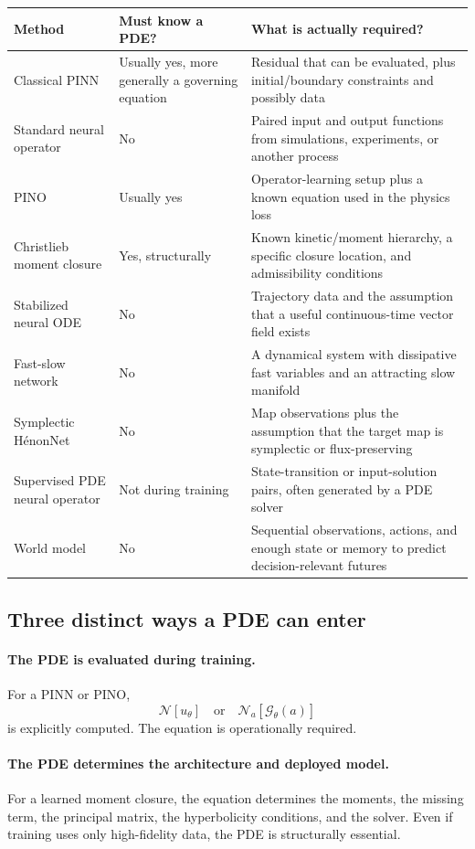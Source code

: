 \documentclass[11pt]{article}
\newcommand{\G}{\mathcal{G}}
\newcommand{\N}{\mathcal{N}}
\begin{document}
\begin{center}
\begin{tabularx}{\textwidth}{@{}P{0.28\textwidth}P{0.18\textwidth}Y@{}}
\toprule
\textbf{Method} & \textbf{Must know a PDE?} & \textbf{What is actually required?} \\
\midrule
Classical PINN & Usually yes, more generally a governing equation & Residual that can be evaluated, plus initial/boundary constraints and possibly data \\
Standard neural operator & No & Paired input and output functions from simulations, experiments, or another process \\
PINO & Usually yes & Operator-learning setup plus a known equation used in the physics loss \\
Christlieb moment closure & Yes, structurally & Known kinetic/moment hierarchy, a specific closure location, and admissibility conditions \\
Stabilized neural ODE & No & Trajectory data and the assumption that a useful continuous-time vector field exists \\
Fast-slow network & No & A dynamical system with dissipative fast variables and an attracting slow manifold \\
Symplectic H\'enonNet & No & Map observations plus the assumption that the target map is symplectic or flux-preserving \\
Supervised PDE neural operator & Not during training & State-transition or input-solution pairs, often generated by a PDE solver \\
World model & No & Sequential observations, actions, and enough state or memory to predict decision-relevant futures \\
\bottomrule
\end{tabularx}
\end{center}

\subsection{Three distinct ways a PDE can enter}

\paragraph{The PDE is evaluated during training.}
For a PINN or PINO,
\[
 \N[u_\theta]
 \quad\text{or}\quad
 \N_a[\G_\theta(a)]
\]
is explicitly computed. The equation is operationally required.

\paragraph{The PDE determines the architecture and deployed model.}
For a learned moment closure, the equation determines the moments, the missing term, the principal matrix, the hyperbolicity conditions, and the solver. Even if training uses only high-fidelity data, the PDE is structurally essential.
\end{document}
